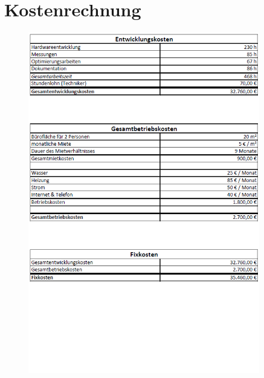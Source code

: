 \section{Kostenrechnung}	
\begin{figure} [H]
	\centering
	\includegraphics[width=0.9\textwidth]{form/Fixkosten.png}
\end{figure}
